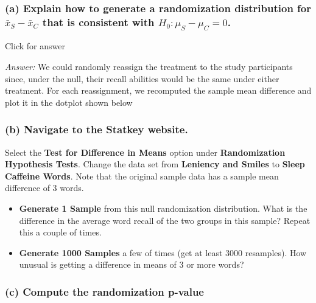 \documentclass[
]{book}
\providecommand{\tightlist}{%
  \setlength{\itemsep}{0pt}\setlength{\parskip}{0pt}}
\begin{document}
\hypertarget{a-explain-how-to-generate-a-randomization-distribution-for-barx_s---barx_c-that-is-consistent-with-h_0-mu_s---mu_c-0.}{%
\subsubsection{\texorpdfstring{(a) Explain how to generate a randomization distribution for \(\bar{x}_S - \bar{x}_C\) that is consistent with \(H_0: \mu_S - \mu_C = 0\).}{(a) Explain how to generate a randomization distribution for \textbackslash bar\{x\}\_S - \textbackslash bar\{x\}\_C that is consistent with H\_0: \textbackslash mu\_S - \textbackslash mu\_C = 0.}}\label{a-explain-how-to-generate-a-randomization-distribution-for-barx_s---barx_c-that-is-consistent-with-h_0-mu_s---mu_c-0.}}

Click for answer

\emph{Answer:} We could randomly reassign the treatment to the study participants since, under the null, their recall abilities would be the same under either treatment. For each reassignment, we recomputed the sample mean difference and plot it in the dotplot shown below

\hypertarget{b-navigate-to-the-statkey-website.}{%
\subsubsection{(b) Navigate to the Statkey website.}\label{b-navigate-to-the-statkey-website.}}

Select the \textbf{Test for Difference in Means} option under \textbf{Randomization Hypothesis Tests}. Change the data set from \textbf{Leniency and Smiles} to \textbf{Sleep Caffeine Words}. Note that the original sample data has a sample mean difference of 3 words.

\begin{itemize}
\tightlist
\item
  \textbf{Generate 1 Sample} from this null randomization distribution. What is the difference in the average word recall of the two groups in this sample? Repeat this a couple of times.
\item
  \textbf{Generate 1000 Samples} a few of times (get at least 3000 resamples). How unusual is getting a difference in means of 3 or more words?
\end{itemize}

\vspace*{.5in}

\hypertarget{c-compute-the-randomization-p-value}{%
\subsubsection{(c) Compute the randomization p-value}\label{c-compute-the-randomization-p-value}}
\end{document}
